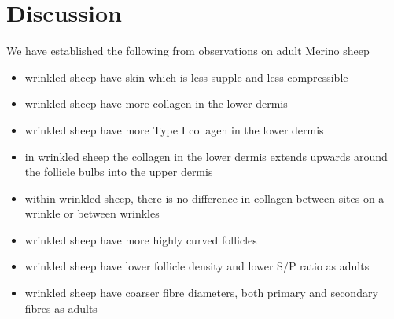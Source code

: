 \documentclass[titlepage]{article}  %
\begin{document}
\section{Discussion}
We have established the following from observations on adult Merino sheep
\begin{itemize}
\item wrinkled sheep have skin which is less supple and less compressible
\item wrinkled sheep have more collagen in the lower dermis
\item wrinkled sheep have more Type I collagen in the lower dermis
\item in wrinkled sheep the collagen in the lower dermis extends upwards around the follicle bulbs into the upper dermis
\item within wrinkled sheep, there is no difference in collagen between sites on a wrinkle or between wrinkles 
\item wrinkled sheep have more highly curved follicles
\item wrinkled sheep have lower follicle density and lower S/P ratio as adults
\item wrinkled sheep have coarser fibre diameters, both primary and secondary fibres as adults
\end{itemize}
\end{document}

